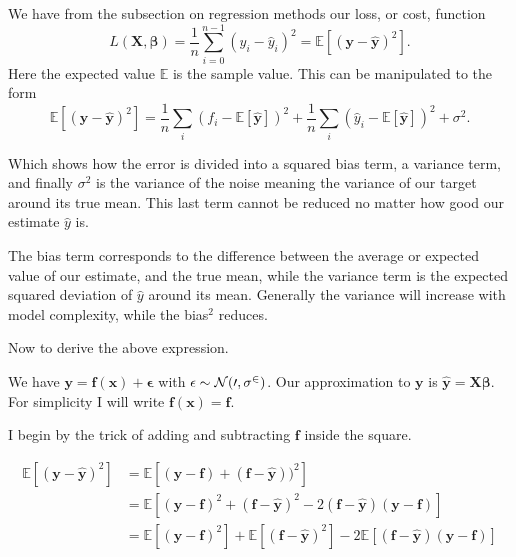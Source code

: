 \documentclass[11pt]{article}
\begin{document}
We have from the subsection on regression methods our loss, or cost,
function \[
L(\boldsymbol{X},\boldsymbol{\beta}) =\frac{1}{n}\sum_{i=0}^{n-1}(y_i-\hat{y}_i)^2=\mathbb{E}\left[(\boldsymbol{y}-\boldsymbol{\hat{y}})^2\right].
\] Here the expected value \(\mathbb{E}\) is the sample value. This can
be manipulated to the form \[
\mathbb{E}\left[(\boldsymbol{y}-\boldsymbol{\hat{y}})^2\right]=\frac{1}{n}\sum_i(f_i-\mathbb{E}\left[\boldsymbol{\hat{y}}\right])^2+\frac{1}{n}\sum_i(\hat{y}_i-\mathbb{E}\left[\boldsymbol{\hat{y}}\right])^2+\sigma^2.
\]

Which shows how the error is divided into a squared bias term, a
variance term, and finally \(\sigma^2\) is the variance of the noise
meaning the variance of our target around its true mean. This last term
cannot be reduced no matter how good our estimate \(\hat{y}\) is.

The bias term corresponds to the difference between the average or
expected value of our estimate, and the true mean, while the variance
term is the expected squared deviation of \(\hat{y}\) around its mean.
Generally the variance will increase with model complexity, while the
bias\(^2\) reduces.

Now to derive the above expression.

We have
\(\boldsymbol{y}=\boldsymbol{f}(\boldsymbol{x}) + \boldsymbol{\epsilon}\)
with \(\epsilon \sim \cal{N}(0,\sigma^2)\). Our approximation to
\(\boldsymbol{y}\) is
\(\boldsymbol{\hat{y}}=\boldsymbol{X}\boldsymbol{\beta}\). For
simplicity I will write
\(\boldsymbol{f}(\boldsymbol{x})=\boldsymbol{f}\).

I begin by the trick of adding and subtracting \(\boldsymbol{f}\) inside
the square.

    \[
\begin{aligned}
\mathbb{E}\left[(\boldsymbol{y}-\boldsymbol{\hat{y}})^2\right] &= \mathbb{E}\left[(\boldsymbol{y}-\boldsymbol{f})+(\boldsymbol{f}-\boldsymbol{\hat{y}}))^2\right]\\
&=\mathbb{E}\left[(\boldsymbol{y}-\boldsymbol{f})^2 + (\boldsymbol{f}-\boldsymbol{\hat{y}})^2 - 2(\boldsymbol{f}-\boldsymbol{\hat{y}})(\boldsymbol{y}-\boldsymbol{f})\right]\\
&=\mathbb{E}[(\boldsymbol{y}-\boldsymbol{f})^2] + \mathbb{E}[(\boldsymbol{f}-\boldsymbol{\hat{y}})^2] - 2\mathbb{E}[(\boldsymbol{f}-\boldsymbol{\hat{y}})(\boldsymbol{y}-\boldsymbol{{f}})]\\
\end{aligned}
\]
\end{document}
